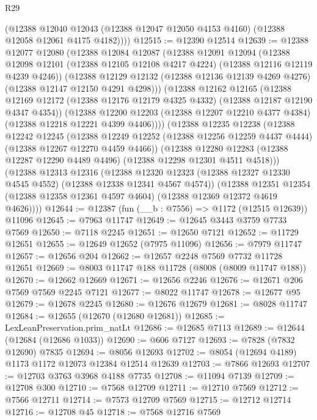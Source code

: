 \begin{lexlean}{R29}
\begin{coremodule}
        (@12388
          @12040
          @12043
          (@12388 @12047 @12050 @4153 @4160)
          (@12388 @12058 @12061 @4175 @4182))))
@12515 := @12390 @12514
@12639 := @12388
    @12077
    @12080
    (@12388
      @12084
      @12087
      (@12388
        @12091
        @12094
        (@12388 @12098 @12101 (@12388 @12105 @12108 @4217 @4224) (@12388 @12116 @12119 @4239 @4246))
        (@12388
          @12129
          @12132
          (@12388 @12136 @12139 @4269 @4276)
          (@12388 @12147 @12150 @4291 @4298)))
      (@12388
        @12162
        @12165
        (@12388 @12169 @12172 (@12388 @12176 @12179 @4325 @4332) (@12388 @12187 @12190 @4347 @4354))
        (@12388
          @12200
          @12203
          (@12388 @12207 @12210 @4377 @4384)
          (@12388 @12218 @12221 @4399 @4406))))
    (@12388
      @12235
      @12238
      (@12388
        @12242
        @12245
        (@12388 @12249 @12252 (@12388 @12256 @12259 @4437 @4444) (@12388 @12267 @12270 @4459 @4466))
        (@12388
          @12280
          @12283
          (@12388 @12287 @12290 @4489 @4496)
          (@12388 @12298 @12301 @4511 @4518)))
      (@12388
        @12313
        @12316
        (@12388 @12320 @12323 (@12388 @12327 @12330 @4545 @4552) (@12388 @12338 @12341 @4567 @4574))
        (@12388
          @12351
          @12354
          (@12388 @12358 @12361 @4597 @4604)
          (@12388 @12369 @12372 @4619 @4626))))
@12644 := @12387 (fun (__b : @7556) => @1172 (@12515 @12639)) @11096
@12645 := @7963 @11747
@12649 := @12645 @3443 @3759 @7733 @7569
@12650 := @7118 @2245
@12651 := @12650 @7121
@12652 := @11729 @12651
@12655 := @12649 @12652 (@7975 @11096)
@12656 := @7979 @11747
@12657 := @12656 @204
@12662 := @12657 @2248 @7569 @7732 @11728 @12651
@12669 := @8003 @11747 @188 @11728 (@8008 (@8009 @11747 @188))
@12670 := @12662 @12669
@12671 := @12656 @2246
@12676 := @12671 @206 @7569 @7569 @2245 @7121
@12677 := @8022 @11747
@12678 := @12677 @95
@12679 := @12678 @2245
@12680 := @12676 @12679
@12681 := @8028 @11747
@12684 := @12655 (@12670 (@12680 @12681))
@12685 := LexLeanPreservation.prim_natLt
@12686 := @12685 @7113
@12689 := @12644 (@12684 (@12686 @1033))
@12690 := @606 @7127
@12693 := @7828 (@7832 @12690) @7835
@12694 := @8056 @12693
@12702 := @8054 (@12694 @4189) @1173 @1172 @12073 @12384 @12514 @12639
@12703 := @7866 @12693
@12707 := @12703 @3763 @3968 @4188 @7735
@12708 := @11094 @7139
@12709 := @12708 @300
@12710 := @7568 @12709
@12711 := @12710 @7569
@12712 := @7566 @12711
@12714 := @7573 @12709 @7569
@12715 := @12712 @12714
@12716 := @12708 @45
@12718 := @7568 @12716 @7569

\end{coremodule}
\end{lexlean}
